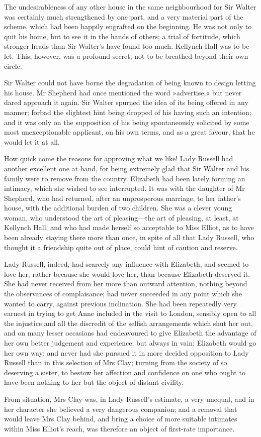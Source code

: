 The undesirableness of any other house in the same neighbourhood for Sir Walter was certainly much strengthened by one part, and a very material part of the scheme, which had been happily engrafted on the beginning. He was not only to quit his home, but to see it in the hands of others; a trial of fortitude, which stronger heads than Sir Walter's have found too much. Kellynch Hall was to be let. This, however, was a profound secret, not to be breathed beyond their own circle.

Sir Walter could not have borne the degradation of being known to design letting his house. Mr Shepherd had once mentioned the word »advertise,« but never dared approach it again. Sir Walter spurned the idea of its being offered in any manner; forbad the slightest hint being dropped of his having such an intention; and it was only on the supposition of his being spontaneously solicited by some most unexceptionable applicant, on his own terms, and as a great favour, that he would let it at all.

How quick come the reasons for approving what we like! Lady Russell had another excellent one at hand, for being extremely glad that Sir Walter and his family were to remove from the country. Elizabeth had been lately forming an intimacy, which she wished to see interrupted. It was with the daughter of Mr Shepherd, who had returned, after an unprosperous marriage, to her father's house, with the additional burden of two children. She was a clever young woman, who understood the art of pleasing—the art of pleasing, at least, at Kellynch Hall; and who had made herself so acceptable to Miss Elliot, as to have been already staying there more than once, in spite of all that Lady Russell, who thought it a friendship quite out of place, could hint of caution and reserve.

Lady Russell, indeed, had scarcely any influence with Elizabeth, and seemed to love her, rather because she would love her, than because Elizabeth deserved it. She had never received from her more than outward attention, nothing beyond the observances of complaisance; had never succeeded in any point which she wanted to carry, against previous inclination. She had been repeatedly very earnest in trying to get Anne included in the visit to London, sensibly open to all the injustice and all the discredit of the selfish arrangements which shut her out, and on many lesser occasions had endeavoured to give Elizabeth the advantage of her own better judgement and experience; but always in vain: Elizabeth would go her own way; and never had she pursued it in more decided opposition to Lady Russell than in this selection of Mrs Clay; turning from the society of so deserving a sister, to bestow her affection and confidence on one who ought to have been nothing to her but the object of distant civility.

From situation, Mrs Clay was, in Lady Russell's estimate, a very unequal, and in her character she believed a very dangerous companion; and a removal that would leave Mrs Clay behind, and bring a choice of more suitable intimates within Miss Elliot's reach, was therefore an object of first-rate importance.